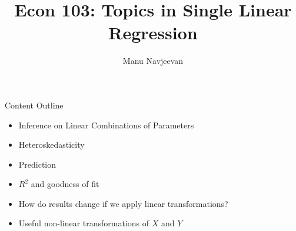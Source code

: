 \documentclass[notheorems, 9pt]{beamer}
\title{Econ 103: Topics in Single Linear Regression}
\author{Manu Navjeevan}
\institute{UCLA}
\begin{document}
\frame{\titlepage}


\begin{frame}{Content Outline} 
	\label{frame:content-outline}
	\begin{itemize}
		\item Inference on Linear Combinations of Parameters
		\item Heteroskedasticity
	\end{itemize}
	\begin{itemize}
		\item Prediction
		\item \(R^2\) and goodness of fit
	\end{itemize}
	\begin{itemize}
		\item How do results change if we apply linear transformations?
		\item Useful non-linear transformations of \(X\) and \(Y\)
	\end{itemize}
\end{frame}
\end{document}
